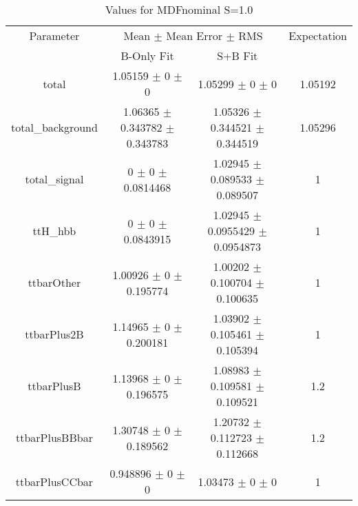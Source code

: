 \begin{table}
\centering
\caption{Values for MDFnominal S=1.0}
\begin{tabular}{cccc}
\toprule
Parameter & \multicolumn{2}{c}{Mean $\pm$ Mean Error $\pm$ RMS} & Expectation\\
 & B-Only Fit & S+B Fit & \\
\midrule
total & \num{1.05159} $\pm$ \num{0} $\pm$ \num{0} & \num{1.05299} $\pm$ \num{0} $\pm$ \num{0} & \num{1.05192}\\
total\_background & \num{1.06365} $\pm$ \num{0.343782} $\pm$ \num{0.343783} & \num{1.05326} $\pm$ \num{0.344521} $\pm$ \num{0.344519} & \num{1.05296}\\
total\_signal & \num{0} $\pm$ \num{0} $\pm$ \num{0.0814468} & \num{1.02945} $\pm$ \num{0.089533} $\pm$ \num{0.089507} & \num{1}\\
ttH\_hbb & \num{0} $\pm$ \num{0} $\pm$ \num{0.0843915} & \num{1.02945} $\pm$ \num{0.0955429} $\pm$ \num{0.0954873} & \num{1}\\
ttbarOther & \num{1.00926} $\pm$ \num{0} $\pm$ \num{0.195774} & \num{1.00202} $\pm$ \num{0.100704} $\pm$ \num{0.100635} & \num{1}\\
ttbarPlus2B & \num{1.14965} $\pm$ \num{0} $\pm$ \num{0.200181} & \num{1.03902} $\pm$ \num{0.105461} $\pm$ \num{0.105394} & \num{1}\\
ttbarPlusB & \num{1.13968} $\pm$ \num{0} $\pm$ \num{0.196575} & \num{1.08983} $\pm$ \num{0.109581} $\pm$ \num{0.109521} & \num{1.2}\\
ttbarPlusBBbar & \num{1.30748} $\pm$ \num{0} $\pm$ \num{0.189562} & \num{1.20732} $\pm$ \num{0.112723} $\pm$ \num{0.112668} & \num{1.2}\\
ttbarPlusCCbar & \num{0.948896} $\pm$ \num{0} $\pm$ \num{0} & \num{1.03473} $\pm$ \num{0} $\pm$ \num{0} & \num{1}\\
\bottomrule
\end{tabular}
\end{table}